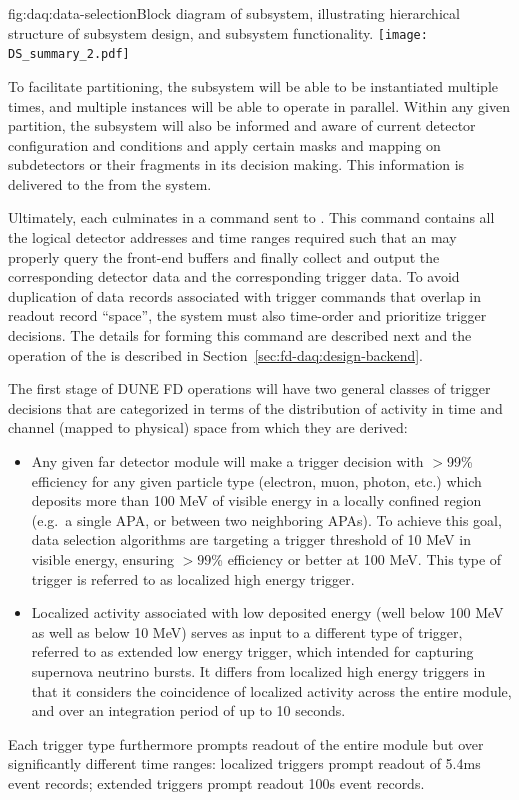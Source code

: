 \begin{dunefigure}{fig:daq:data-selection}{Block diagram of  
     subsystem, illustrating hierarchical structure of
    subsystem design, and subsystem functionality.}
  \texttt{[image: DS\_summary\_2.pdf]}
\end{dunefigure}

To facilitate partitioning, the  subsystem will be
able to be instantiated multiple times, and multiple instances will be
able to operate in parallel. Within any
given partition, the  subsystem will also be
informed and aware of current detector configuration and conditions and
apply certain masks and mapping on subdetectors or their fragments in
its decision making. This information is delivered to the
 from the  system.

Ultimately, each  culminates in a command sent to . 
This command contains all the logical detector addresses and time ranges
required such that an  may properly query the front-end
buffers and finally collect and output the corresponding detector data
and the corresponding trigger data. To avoid duplication of data
records associated with trigger commands that overlap in readout
record ``space'', the  system must also time-order and
prioritize trigger decisions. The details for forming this
command are described next and the operation of the  is
described in Section~\ref{sec:fd-daq:design-backend}.

The first stage of DUNE FD operations will have two general classes of trigger
decisions that are categorized in terms of the distribution of activity
in time and channel (mapped to physical) space from which they are derived: 
\begin{itemize}
\item Any given far detector module will make a 
  trigger decision with $>$99\% efficiency for any given particle
  type (electron, muon, photon, etc.) 
  which deposits more than 100 MeV of visible energy in a locally
  confined region (e.g.~a single APA, or between two neighboring APAs). To achieve this
  goal, data selection algorithms are targeting a trigger threshold of
  10 MeV in visible energy, ensuring $>99$\% efficiency or better
  at 100 MeV. 
  This type of trigger is referred to as localized high
  energy trigger.
\item    Localized activity associated with low deposited energy (well
  below 100 MeV as well as below 10 MeV) serves as input to a different type of trigger,
  referred to as extended low energy trigger, which intended for
  capturing supernova neutrino bursts. It differs from localized high
  energy triggers in that it considers the coincidence of localized
  activity across the entire module, and over an integration period of up to 10
  seconds.
\end{itemize}
Each trigger type furthermore prompts readout
    of the entire module but over significantly different time
    ranges: localized triggers prompt readout of 5.4\si{\milli\second} event records; extended
    triggers prompt readout 100\si{\second} event records. 

